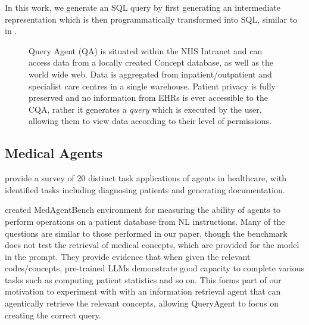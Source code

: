 \documentclass[11pt]{article}
\begin{document}
In this work, we generate an SQL query by first generating an intermediate representation which is then programmatically transformed into SQL, similar to in \cite{guo_towards_2019}.


\begin{figure}[htbp]
	\centering
	
	\caption{
Query Agent (QA) is situated within the NHS Intranet and can access data from a locally created Concept database, as well as the world wide web.
Data is aggregated from inpatient/outpatient and specialist care centres in a single warehouse. Patient privacy is fully preserved and no information from EHRs is ever accessible to the CQA, rather it generates a \textit{query} which is executed by the user, allowing them to view data according to their level of permissions.
}
	\label{fig:system-diagram}
\end{figure}

\subsection{Medical Agents}
\citep{wang_survey_2025} provide a survey of 20 distinct task applications of agents in healthcare, with identified tasks including diagnosing patients and generating documentation.

\citep{jiang_medagentbench_2025} created MedAgentBench environment for measuring the ability of agents to perform operations on a patient database from NL instructions.
Many of the questions are similar to those performed in our paper, though the benchmark does not test the retrieval of medical concepts, which are provided for the model in the prompt.
They provide evidence that when given the relevant codes/concepts, pre-trained LLMs demonstrate good capacity to complete various tasks such as computing patient statistics and so on.
This forms part of our motivation to experiment with with an information retrieval agent that can agentically retrieve the relevant concepts, allowing QueryAgent to focus on creating the correct query. 
\end{document}
